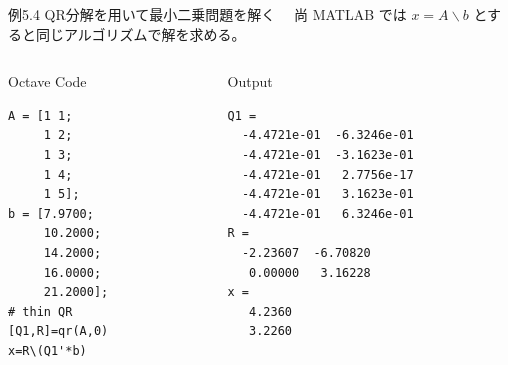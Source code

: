 \documentclass[dvipdfmx,10pt,presentation]{beamer}
\begin{document}
\begin{frame}[fragile,label={sec:org8a54b52}]{例5.4 QR分解を用いて最小二乗問題を解く}
 　尚 MATLAB では \(x=A\backslash b\) とすると同じアルゴリズムで解を求める。\\
\begin{columns}
\begin{column}{0.23\columnwidth}
\begin{block}{Octave Code}
\begin{verbatim}
A = [1 1;
     1 2; 
     1 3;
     1 4;
     1 5];
b = [7.9700;
     10.2000;
     14.2000;
     16.0000;
     21.2000];
# thin QR
[Q1,R]=qr(A,0)
x=R\(Q1'*b)
\end{verbatim}
\end{block}
\end{column}

\begin{column}{0.73\columnwidth}
\begin{block}{Output}
\begin{verbatim}
Q1 =
  -4.4721e-01  -6.3246e-01
  -4.4721e-01  -3.1623e-01
  -4.4721e-01   2.7756e-17
  -4.4721e-01   3.1623e-01
  -4.4721e-01   6.3246e-01
R =
  -2.23607  -6.70820
   0.00000   3.16228
x =
   4.2360
   3.2260
\end{verbatim}
\end{block}
\end{column}
\end{columns}
\end{frame}
\end{document}

